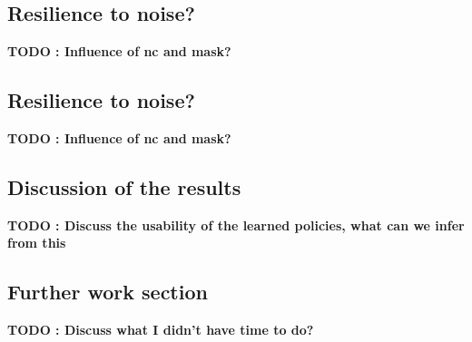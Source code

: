 \subsection{Resilience to noise?}
\textbf{TODO : Influence of nc and mask?}

\subsection{Resilience to noise?}
\textbf{TODO : Influence of nc and mask?}

\subsection{Discussion of the results}
\textbf{TODO : Discuss the usability of the learned policies, what can we infer from this}


\subsection{Further work section}
\textbf{TODO : Discuss what I didn't have time to do?}